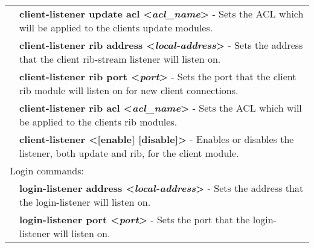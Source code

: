 \begin{tabular}{|p{10pt}p{400pt}|}
& {\bf \small client-listener update acl \textless\emph{acl\_name}\textgreater} - Sets the ACL which will be applied to the clients update modules.\\[4pt]

& {\bf \small client-listener rib address \textless\emph{local-address}\textgreater} - Sets the address that the client rib-stream listener will listen on.\\[4pt]

& {\bf \small client-listener rib port \textless\emph{port}\textgreater} - Sets the port that the client rib module will listen on for new client connections.\\[4pt]

& {\bf \small client-listener rib acl \textless\emph{acl\_name}\textgreater} - Sets the ACL which will be applied to the clients rib modules.\\[4pt]

& {\bf \small client-listener \textless[enable] [disable]\textgreater} - Enables or disables the listener, both update and rib, for the client module.\\[4pt]




\hline

\multicolumn{2}{|l|}{Login commands:}\\ 

\hline

& {\bf \small login-listener address \textless\emph{local-address}\textgreater} - Sets the address that the login-listener will listen on.\\[4pt]

& {\bf \small login-listener port \textless\emph{port}\textgreater} - Sets the port that the login-listener will listen on.\\[4pt]


\end{tabular}
